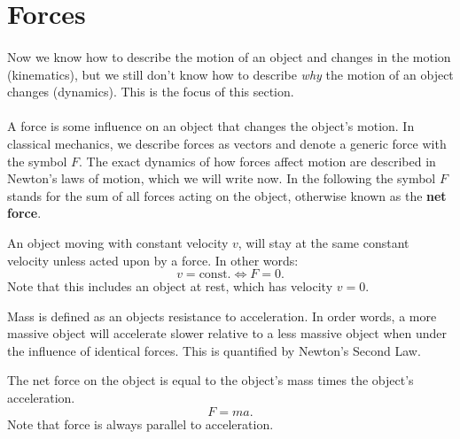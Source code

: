 \documentclass[../classical_mechanics.tex]{subfiles}
\begin{document}
    \section{Forces}\label{sec:forces}
        \paragraph{}
        Now we know how to describe the motion of an object and changes in the motion (kinematics), but we still don't know how to describe \textit{why} the motion of an object changes (dynamics).
        This is the focus of this section.

        \paragraph{}
        A force is some influence on an object that changes the object's motion.
        In classical mechanics, we describe forces as vectors and denote a generic force with the symbol $F$.
        The exact dynamics of how forces affect motion are described in Newton's laws of motion, which we will write now.
        In the following the symbol $F$ stands for the sum of all forces acting on the object, otherwise known as the \textbf{net force}.
        \begin{definition}\label{def:newton-1}
            An object moving with constant velocity $v$, will stay at the same constant velocity unless acted upon by a force.
            In other words:
            \begin{equation}
                v=\text{const.}\iff F=0.
            \end{equation}
            Note that this includes an object at rest, which has velocity $v=0$.
        \end{definition}
        Mass is defined as an objects resistance to acceleration.
        In order words, a more massive object will accelerate slower relative to a less massive object when under the influence of identical forces.
        This is quantified by Newton's Second Law.
        \begin{definition}\label{def:newton-2}
            The net force on the object is equal to the object's mass times the object's acceleration.
            \begin{equation}
                F=ma.
            \end{equation}
            Note that force is always parallel to acceleration.
        \end{definition}
\end{document}
